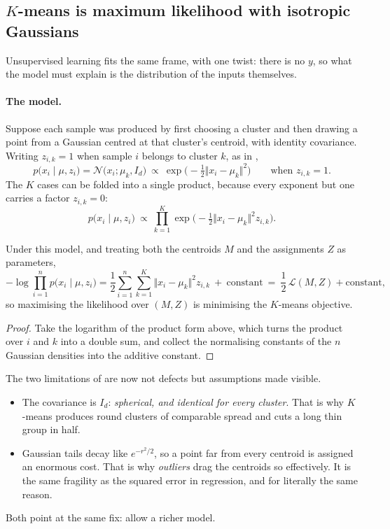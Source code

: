 \subsection{$K$-means is maximum likelihood with isotropic Gaussians}
\label{subsec:mle-kmeans}

Unsupervised learning fits the same frame, with one twist: there is no $y$, so what the
model must explain is the distribution of the inputs themselves.

\paragraph{The model.}
Suppose each sample was produced by first choosing a cluster and then drawing a point
from a Gaussian centred at that cluster's centroid, with identity covariance. Writing
$z_{i,k} = 1$ when sample $i$ belongs to cluster $k$, as in ,
\[
p\big( x_i \mid \mu, z_i \big) = \mathcal{N}\big( x_i ; \mu_k, I_d \big)
\ \propto \ \exp\Big( - \tfrac{1}{2} \big\Vert x_i - \mu_k \big\Vert^2 \Big)
\qquad \text{when } z_{i,k} = 1 .
\]
The $K$ cases can be folded into a single product, because every exponent but one
carries a factor $z_{i,k} = 0$:
\[
p\big( x_i \mid \mu, z_i \big) \ \propto \ \prod_{k=1}^K
\exp\Big( - \tfrac{1}{2} \big\Vert x_i - \mu_k \big\Vert^2 z_{i,k} \Big) .
\]

\begin{prop}
\label{prop:mle-kmeans}
Under this model, and treating both the centroids $M$ and the assignments $Z$ as
parameters,
\[
- \log \prod_{i=1}^n p\big( x_i \mid \mu, z_i \big)
= \frac{1}{2} \sum_{i=1}^n \sum_{k=1}^K \big\Vert x_i - \mu_k \big\Vert^2 z_{i,k}
\ + \ \text{constant}
\ = \ \frac{1}{2}\, \mathcal{L}(M, Z) + \text{constant} ,
\]
so maximising the likelihood over $(M, Z)$ is minimising the $K$-means objective.
\end{prop}

\begin{proof}
Take the logarithm of the product form above, which turns the product over $i$ and $k$
into a double sum, and collect the normalising constants of the $n$ Gaussian densities
into the additive constant.
\end{proof}

The two limitations of  are now not defects but assumptions made
visible.
\begin{itemize}
    \item The covariance is $I_d$: \emph{spherical, and identical for every cluster}.
    That is why $K$-means produces round clusters of comparable spread and cuts a long
    thin group in half.
    \item Gaussian tails decay like $e^{-r^2/2}$, so a point far from every centroid is
    assigned an enormous cost. That is why \emph{outliers} drag the centroids so
    effectively. It is the same fragility as the squared error in regression, and for
    literally the same reason.
\end{itemize}
Both point at the same fix: allow a richer model.

